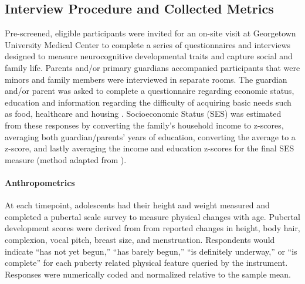 \documentclass[utf8]{frontiersSCNS} %
\begin{document}
\subsection{Interview Procedure and Collected Metrics} Pre-screened, eligible participants were invited for an on-site visit at Georgetown University Medical Center to complete a series of questionnaires and interviews designed to measure neurocognitive developmental traits and capture social and family life. Parents and/or primary guardians accompanied participants that were minors and family members were interviewed in separate rooms. The guardian and/or parent was asked to complete a questionnaire regarding economic status, education and information regarding the difficulty of acquiring basic needs such as food, healthcare and housing \citep{bornstein2003socioeconomic}. Socioeconomic Status (SES) was estimated from these responses by converting the family’s household income to z-scores, averaging both guardian/parents' years of education, converting the average to a z-score, and lastly averaging the income and education z-scores for the final SES measure (method adapted from \cite{manuck2010ses}).
\paragraph{Anthropometrics} At each timepoint, adolescents had their height and weight measured and completed a pubertal scale survey \citep{carskadon1993self} to measure physical changes with age.  Pubertal development scores were derived from from reported changes in height, body hair, complexion, vocal pitch, breast size, and menstruation. Respondents would indicate “has not yet begun,” “has barely begun,” “is definitely underway,” or “is complete” for each puberty related physical feature queried by the instrument. Responses were numerically coded and normalized relative to the sample mean.
\end{document}

